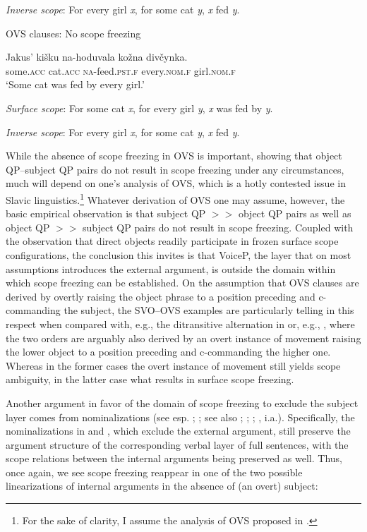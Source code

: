 \documentclass[output=paper,colorlinks,citecolor=brown]{langscibook}
\begin{document}
\textit{Inverse scope}: For every girl \textit{x}, for some cat \textit{y}, \textit{x} fed \textit{y}.
\z


\largerpage[2]
\ea%
    \label{ex:antonyuk:14}
OVS clauses: No scope freezing

\gll           Jakus’ kišku     na-hoduvala     kožna divčynka.\\
  some.\textsc{acc} cat.\textsc{acc}   \textsc{na}-feed.\textsc{pst.f} every.\textsc{nom.f} girl.\textsc{nom.f}\\
\glt `Some cat was fed by every girl.’

\textit{Surface scope}: For some cat \textit{x}, for every girl \textit{y}, \textit{x} was fed by \textit{y}.

\textit{Inverse scope}: For every girl \textit{x}, for some cat \textit{y}, \textit{x} fed \textit{y}.
\z\clearpage

\noindent While the absence of scope freezing in OVS is important, showing that object QP–subject QP pairs do not result in scope freezing under any circumstances, much will depend on one’s analysis of OVS, which is a hotly contested issue in Slavic linguistics.\footnote{\textrm{For the sake of clarity, I assume the analysis of OVS proposed in \citet{Antonyuk2021}.}} Whatever derivation of OVS one may assume, however, the basic empirical observation is that subject QP $>>$ object QP pairs as well as object QP $>>$  subject QP pairs do not result in scope freezing. Coupled with the observation that direct objects readily participate in frozen surface scope configurations, the conclusion this invites is that VoiceP, the layer that on most assumptions introduces the external argument, is outside the domain within which scope freezing can be established. On the assumption that OVS clauses are derived by overtly raising the object phrase to a position preceding and c-commanding the subject, the SVO--OVS examples are particularly telling in this respect when compared with, e.g., the ditransitive alternation in  or, e.g., , where the two orders are arguably also derived by an overt instance of movement raising the lower object to a position preceding and c-commanding the higher one. Whereas in the former cases the overt instance of movement still yields scope ambiguity, in the latter case what results in surface scope freezing.


Another argument in favor of the domain of scope freezing to exclude the subject layer comes from nominalizations (see esp. \citealt{Alexiadou2009, Alexiadou2017a}; \citealt{Borer2014}; see also \citealt{Chomsky1970}; \citealt{Grimshaw1990}; \citealt{Harley2009}; \citealt{Marantz1997}, i.a.). Specifically, the nominalizations in  and , which exclude the external argument, still preserve the argument structure of the corresponding verbal layer of full sentences, with the scope relations between the internal arguments being preserved as well. Thus, once again, we see scope freezing reappear in one of the two possible linearizations of internal arguments in the absence of (an overt) subject:
\end{document}
